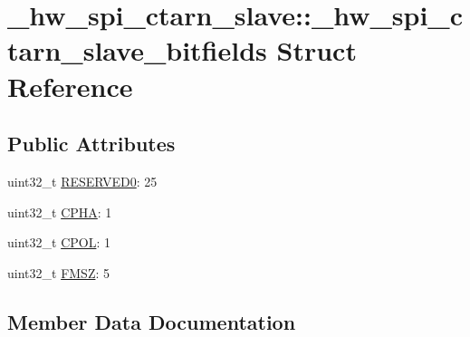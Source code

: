 \hypertarget{struct__hw__spi__ctarn__slave_1_1__hw__spi__ctarn__slave__bitfields}{}\section{\+\_\+hw\+\_\+spi\+\_\+ctarn\+\_\+slave\+:\+:\+\_\+hw\+\_\+spi\+\_\+ctarn\+\_\+slave\+\_\+bitfields Struct Reference}
\label{struct__hw__spi__ctarn__slave_1_1__hw__spi__ctarn__slave__bitfields}
\subsection*{Public Attributes}
\begin{DoxyCompactItemize}
\item 
uint32\+\_\+t \hyperlink{struct__hw__spi__ctarn__slave_1_1__hw__spi__ctarn__slave__bitfields_ac500b054ab4a6a870db292c219b1c20f}{R\+E\+S\+E\+R\+V\+E\+D0}\+: 25
\item 
uint32\+\_\+t \hyperlink{struct__hw__spi__ctarn__slave_1_1__hw__spi__ctarn__slave__bitfields_aa198ba4b7495feba7e8714e5868e9fc0}{C\+P\+HA}\+: 1
\item 
uint32\+\_\+t \hyperlink{struct__hw__spi__ctarn__slave_1_1__hw__spi__ctarn__slave__bitfields_a67a77de2fa20a4666707407ea7a3d61f}{C\+P\+OL}\+: 1
\item 
uint32\+\_\+t \hyperlink{struct__hw__spi__ctarn__slave_1_1__hw__spi__ctarn__slave__bitfields_acfd54e47be09f80880acd51481d675cf}{F\+M\+SZ}\+: 5
\end{DoxyCompactItemize}


\subsection{Member Data Documentation}
